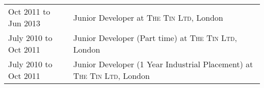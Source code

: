 \documentclass[a4paper,10pt]{article} %
\begin{document}
\clearpage
\begin{tabular}{ L{2cm} | L{11cm}}	



Oct 2011 to Jun 2013 \newline & Junior Developer at \textsc{The Tin Ltd}, London \\





July 2010 to Oct 2011 \newline & Junior Developer (Part time)  at \textsc{The Tin Ltd}, London \\





July 2010 to Oct 2011 & Junior Developer (1 Year Industrial Placement) at \textsc{The Tin Ltd}, London \\





\end{tabular}
\end{document}
